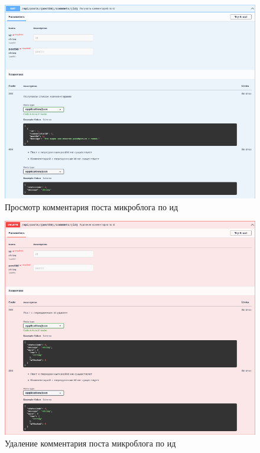 \documentclass[12pt, a4paper, simple]{eskdtext}
\begin{document}
  \begin{figure}[p!h]
    \centering
    \includegraphics[width=14cm]
    {images/SwaggerUi/2023-02-25_18-14-52.png}
    \caption{Просмотр комментария поста микроблога по ид}
    \label{fig:more_9}
  \end{figure}

  \begin{figure}[p!h]
    \centering
    \includegraphics[width=14cm]
    {images/SwaggerUi/2023-02-25_18-15-52.png}
    \caption{Удаление комментария поста микроблога по ид}
    \label{fig:more_10}
  \end{figure}
\end{document}
